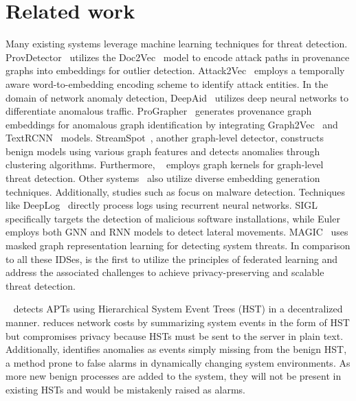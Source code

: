 \section{Related work}
\label{s:relwk}



 Many existing systems leverage machine learning techniques for threat detection. ProvDetector~\cite{provdetector2020} utilizes the Doc2Vec~\cite{le2014distributed} model to encode attack paths in provenance graphs into embeddings for outlier detection. Attack2Vec~\cite{shen2019attack2vec} employs a temporally aware word-to-embedding encoding scheme to identify attack entities. In the domain of network anomaly detection, DeepAid~\cite{deepaid} utilizes deep neural networks to differentiate anomalous traffic. ProGrapher~\cite{yangprographer} generates provenance graph embeddings for anomalous graph identification by integrating Graph2Vec~\cite{narayanan2017graph2vec} and TextRCNN~\cite{lai2015recurrent} models. StreamSpot~\cite{streamspot}, another graph-level detector, constructs benign models using various graph features and detects anomalies through clustering algorithms. Furthermore, \unicorn~\cite{han2020unicorn} employs graph kernels for graph-level threat detection. Other systems~\cite{aljawarneh2018anomaly, maseer2021benchmarking, gyanchandani2012taxonomy,atlas} also utilize diverse embedding generation techniques. Additionally, studies such as \cite{zolkipli2011approach, chakkaravarthy2019survey, isohara2011kernel} focus on malware detection. Techniques like DeepLog~\cite{deeplog2017} directly process logs using recurrent neural networks. SIGL~\cite{sigl} specifically targets the detection of malicious software installations, while Euler~\cite{king2022euler} employs both GNN and RNN models to detect lateral movements. MAGIC~\cite{jia2023magic} uses masked graph representation learning for detecting system threats. In comparison to all these IDSes, \Sys is the first to utilize the principles of federated learning and address the associated challenges to achieve privacy-preserving and scalable threat detection.

\disdet~\cite{dong2023distdet} detects APTs using Hierarchical System Event Trees (HST) in a decentralized manner. \disdet reduces network costs by summarizing system events in the form of HST but compromises privacy because HSTs must be sent to the server in plain text. Additionally, \disdet identifies anomalies as events simply missing from the benign HST, a method prone to false alarms in dynamically changing system environments. As more new benign processes are added to the system, they will not be present in existing HSTs and would be mistakenly raised as alarms.

